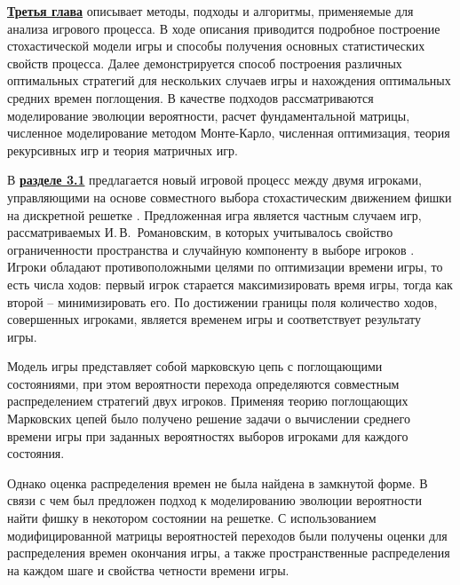 

\underline{\textbf{Третья глава}} описывает методы, подходы и алгоритмы, применяемые для анализа игрового процесса. В ходе описания приводится подробное построение стохастической модели игры и способы получения основных статистических свойств процесса. Далее демонстрируется способ построения различных оптимальных стратегий для нескольких случаев игры и нахождения оптимальных средних времен поглощения. В качестве подходов рассматриваются моделирование эволюции вероятности, расчет фундаментальной матрицы, численное моделирование методом Монте-Карло, численная оптимизация, теория рекурсивных игр и теория матричных игр. 

В \underline{\textbf{разделе 3.1}} предлагается новый игровой процесс между двумя игроками, управляющими на основе совместного выбора стохастическим движением фишки на дискретной решетке \cite{bib3}. Предложенная игра является частным случаем игр, рассматриваемых И.\,В.~Романовским, в которых учитывалось свойство ограниченности пространства и случайную компоненту в выборе игроков \cite{romanovsky_1961}. Игроки обладают противоположными целями по оптимизации времени игры, то есть числа ходов: первый игрок старается максимизировать время игры, тогда как второй -- минимизировать его. По достижении границы поля количество ходов, совершенных игроками, является временем игры и соответствует результату игры.

Модель игры представляет собой марковскую цепь с поглощающими состояниями, при этом вероятности перехода определяются совместным распределением стратегий двух игроков. Применяя теорию поглощающих Марковских цепей было получено решение задачи о вычислении среднего времени игры при заданных вероятностях выборов игроками для каждого состояния. 

Однако оценка распределения времен не была найдена в замкнутой форме. В связи с чем был предложен подход к моделированию эволюции вероятности найти фишку в некотором состоянии на решетке. С использованием модифицированной матрицы вероятностей переходов были получены оценки для распределения времен окончания игры, а также пространственные распределения на каждом шаге и свойства четности времени игры.

